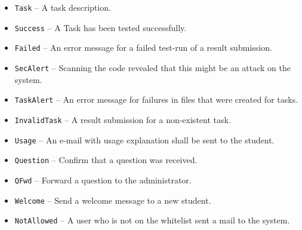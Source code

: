 \begin{description}
\begin{itemize}
            \begin{itemize}
            \item {\tt Task} -- A task description.
            \item {\tt Success} -- A Task has been tested successfully.
            \item {\tt Failed} -- An error message for a failed test-run of a result submission.
            \item {\tt SecAlert} -- Scanning the code revealed that this might be an attack on the system.
            \item {\tt TaskAlert} -- An error message for failures in files that were created for tasks.
            \item {\tt InvalidTask} -- A result submission for a non-existent task.
            \item {\tt Usage} -- An e-mail with usage explanation shall be sent to the student. 
            \item {\tt Question} -- Confirm that a question was received.
            \item {\tt QFwd} -- Forward a question to the administrator.
            \item {\tt Welcome} -- Send a welcome message to a new student.
			\item {\tt NotAllowed} -- A user who is not on the whitelist sent a mail to the system.
            \end{itemize}


\end{itemize}
\end{description}

